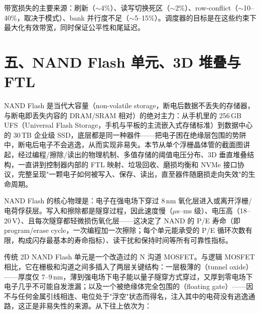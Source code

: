带宽损失的主要来源：刷新（$\sim$4\%）、读写切换死区（$\sim$2\%）、row-conflict（$\sim$10--40\%，取决于模式）、bank 并行度不足（$\sim$5--15\%）。调度器的目标是在这些约束下最大化有效带宽，同时保证公平性和尾延迟。

\section{五、NAND Flash 单元、3D 堆叠与 FTL}

NAND Flash 是当代大容量（non-volatile storage，断电后数据不丢失的存储器，与断电即丢失内容的 DRAM/SRAM 相对）的绝对主力：从手机里的 256\,GB UFS（Universal Flash Storage，手机与平板的主流嵌入式存储标准）到数据中心的 30\,TB 企业级 SSD，底层都是同一种器件——把电子困在绝缘层包围的势阱中，断电后电子不会逃逸，从而实现非易失。本节从单个浮栅晶体管的截面图讲起，经过编程/擦除/读出的物理机制、多值存储的阈值电压分布、3D 垂直堆叠结构，一直讲到控制器内部的 FTL 映射、垃圾回收、磨损均衡和 NVMe 接口协议，完整呈现"一颗电子如何被写入、保存、读出，直至器件随磨损走向失效"的生命周期。

\begin{keyidea}
NAND Flash 的核心物理是：电子在强电场下穿过 8\,nm 氧化层进入或离开浮栅/电荷俘获层。写入和擦除都是隧穿过程，因此速度慢（$\mu$s--ms 级）、电压高（18--20\,V）、且每次隧穿都轻微损伤氧化层——这决定了 NAND 的 P/E 寿命（即 program/erase cycle，一次编程加一次擦除；每个单元能承受的 P/E 循环次数有限，构成闪存最基本的寿命指标）、读干扰和保持时间等所有可靠性指标。
\end{keyidea}


传统 2D NAND Flash 单元是一个改造过的 N 沟道 MOSFET。与逻辑 MOSFET 相比，它在栅极和沟道之间多插入了两层关键结构：一层极薄的（tunnel oxide）——厚度仅 7--9\,nm，薄到强电场下电子能以量子隧穿方式穿过，又厚到零电场下电子几乎不可能自发泄漏；以及一个被绝缘体完全包围的（floating gate）——因不与任何金属引线相连、电位处于"浮空"状态而得名，注入其中的电荷没有逃逸通路，这正是非易失性的来源。从下往上依次为：

